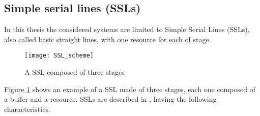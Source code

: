 \subsection{Simple serial lines (SSLs)}
In this thesis the considered systems are limited to Simple Serial Lines (SSLs), also called basic straight lines, with one resource for each of stage. 
\begin{figure}[H] 
\centering    
\texttt{[image: SSL\_scheme]}
\caption[A SSL composed of three stages]{A SSL composed of three stages}
\label{A SSL composed of three stages}
\end{figure}
Figure \ref{A SSL composed of three stages} shows an example of a SSL made of three stages, each one composed of a buffer and a resource. SSLs are described in \cite{Romero-SilvaRodrigo2019Splp}, having the following characteristics.

